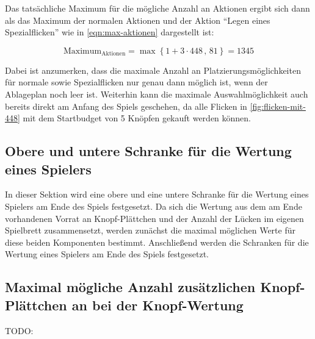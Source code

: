 Das tatsächliche Maximum für die mögliche Anzahl an Aktionen ergibt sich dann als das Maximum der normalen Aktionen und der Aktion \enquote{Legen eines Spezialflicken} wie in \ref{eqn:max-aktionen} dargestellt ist:

\begin{equation}
    \label{eqn:max-aktionen}
    \text{Maximum}_{\text{Aktionen}} = \max \left\{ 1 + 3 \cdot 448\, ,\, 81 \right\} = 1345
\end{equation}

Dabei ist anzumerken, dass die maximale Anzahl an Platzierungsmöglichkeiten für normale sowie Spezialflicken nur genau dann möglich ist, wenn der Ablageplan noch leer ist. Weiterhin kann die maximale Auswahlmöglichkeit auch bereits direkt am Anfang des Spiels geschehen, da alle Flicken in \ref{fig:flicken-mit-448} mit dem Startbudget von 5 Knöpfen gekauft werden können.

\subsection*{Obere und untere Schranke für die Wertung eines Spielers}

In dieser Sektion wird eine obere und eine untere Schranke für die Wertung eines Spielers am Ende des Spiels festgesetzt. Da sich die Wertung aus dem am Ende vorhandenen Vorrat an Knopf-Plättchen und der Anzahl der Lücken im eigenen Spielbrett zusammensetzt, werden zunächst die maximal möglichen Werte für diese beiden Komponenten bestimmt. Anschließend werden die Schranken für die Wertung eines Spielers am Ende des Spiels festgesetzt.

\subsection*{Maximal mögliche Anzahl zusätzlichen Knopf-Plättchen an bei der Knopf-Wertung}

TODO:

